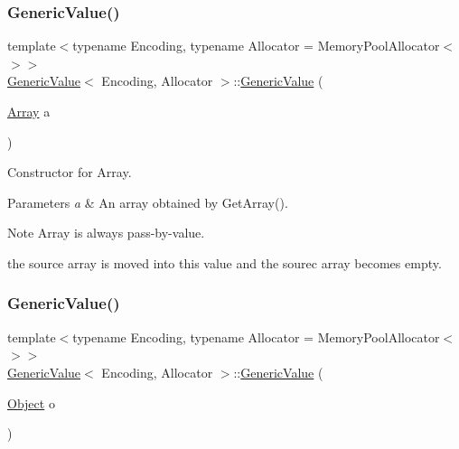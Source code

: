 \subsubsection{\texorpdfstring{Generic\+Value()}{GenericValue()}\hspace{0.1cm}{\footnotesize\ttfamily [4/5]}}
{\footnotesize\ttfamily template$<$typename Encoding, typename Allocator = Memory\+Pool\+Allocator$<$$>$$>$ \\
\hyperlink{a01992}{Generic\+Value}$<$ Encoding, Allocator $>$\+::\hyperlink{a01992}{Generic\+Value} (\begin{DoxyParamCaption}\item[{\hyperlink{a02076}{Array}}]{a }\end{DoxyParamCaption})\hspace{0.3cm}{\ttfamily [inline]}}



Constructor for Array. 


\begin{DoxyParams}{Parameters}
{\em a} & An array obtained by {\ttfamily Get\+Array()}. \\
\hline
\end{DoxyParams}
\begin{DoxyNote}{Note}
{\ttfamily Array} is always pass-\/by-\/value. 

the source array is moved into this value and the sourec array becomes empty. 
\end{DoxyNote}
\mbox{\label{a01992_a9c294e56f4ab940f845f7c171b183483}} 
\subsubsection{\texorpdfstring{Generic\+Value()}{GenericValue()}\hspace{0.1cm}{\footnotesize\ttfamily [5/5]}}
{\footnotesize\ttfamily template$<$typename Encoding, typename Allocator = Memory\+Pool\+Allocator$<$$>$$>$ \\
\hyperlink{a01992}{Generic\+Value}$<$ Encoding, Allocator $>$\+::\hyperlink{a01992}{Generic\+Value} (\begin{DoxyParamCaption}\item[{\hyperlink{a02080}{Object}}]{o }\end{DoxyParamCaption})\hspace{0.3cm}{\ttfamily [inline]}}



